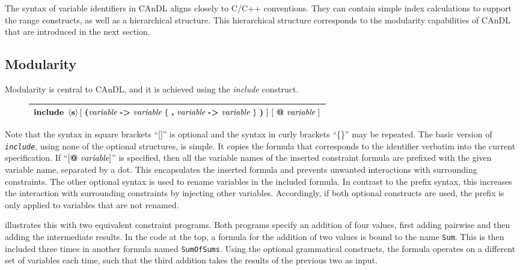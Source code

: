     \noindent
    The syntax of variable identifiers in CAnDL aligns closely to C/C++
    conventions.
    They can contain simple index calculations to support the range constructs,
    as well as a hierarchical structure.
    This hierarchical structure corresponds to the modularity capabilities of
    CAnDL that are introduced in the next section.

\subsection{Modularity}

    Modularity is central to CAnDL, and it is achieved using the {\it include}
    construct.
    \begin{figure}[h]
        \centering
        \begin{tabular}{|c|}
            \hline
            $\text{\bf include}\ \left<\text{\bf s}\right>
                                [\ \text{\bf (}\text{\it variable}\ \text{\bf ->}\ \text{\it variable}\ \{\ \text{\bf ,}\ \text{\it variable}\ \text{\bf ->}\ \text{\it variable}\ \}\ \text{\bf )}\ ]\ 
                                [\ \text{\bf @}\ \text{\it variable}\ ]$\\
            \hline
        \end{tabular}
    \end{figure}

    \noindent
    Note that the syntax in square brackets ``[]'' is optional and the syntax in
    curly brackets ``\{\}'' may be repeated.
    The basic version of \texttt{\it include}, using none of the optional
    structures, is simple.
    It copies the formula that corresponds to the identifier verbatim into
    the current specification.
    If ``$[\text{\bf @}\ \text{\it variable}]$'' is specified, then all the
    variable names of the inserted constraint formula are prefixed with the
    given variable name, separated by a dot.
    This encapsulates the inserted formula and prevents unwanted
    interactions with surrounding constraints.
    The other optional syntax is used to rename variables in the included
    formula.
    In contrast to the prefix syntax, this increases the interaction with
    surrounding constraints by injecting other variables.
    Accordingly, if both optional constructs are used, the prefix is only
    applied to variables that are not renamed.

     illustrates this with two
    equivalent constraint programs.
    Both programs specify an addition of four values, first adding pairwise and
    then adding the intermediate results.
    In the code at the top, a formula for the addition of two values is
    bound to the name {\tt Sum}.
    This is then included three times in another formula named {\tt SumOfSums}.
    Using the optional grammatical constructs, the formula operates on a
    different set of variables each time, such that the third addition
    takes the results of the previous two as input.

